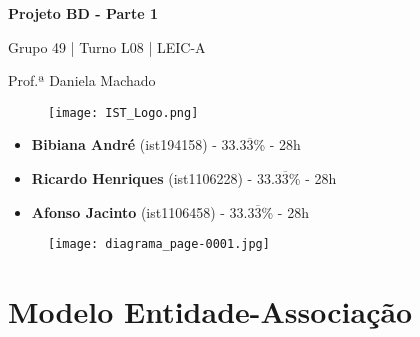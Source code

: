 \documentclass[12pt,a4paper]{article}
\begin{document}
  \begin{titlepage}
    \begin{center}
      \vspace*{5cm}
      \Huge
      \textbf{Projeto BD - Parte 1}

      \vspace{0.5cm}
      \LARGE
      Grupo 49 | Turno L08 | LEIC-A

      \vspace{1.0cm}
      \large
      Prof.ª Daniela Machado

      \vspace{2.0cm}
      \begin{figure}[h]
          \centering
          \texttt{[image: IST\_Logo.png]}
      \end{figure}

      \vfill
      \large
      \begin{minipage}{0.8\textwidth}
        \begin{itemize}
          \item[] \textbf{Bibiana André} (ist194158) - 33.3$\overline{3}$\% - 28h
          \item[] \textbf{Ricardo Henriques} (ist1106228) - 33.3$\overline{3}$\% - 28h
          \item[] \textbf{Afonso Jacinto} (ist1106458) - 33.3$\overline{3}$\% - 28h
        \end{itemize}
      \end{minipage}
    \end{center}
  \end{titlepage}

\begin{figure}[htbp]
    \centering
    \hspace*{-2cm}
    \texttt{[image: diagrama\_page-0001.jpg]}
\end{figure}

\section*{Modelo Entidade-Associação}
\end{document}
